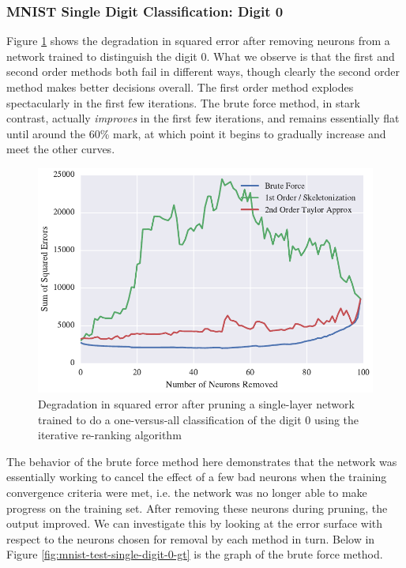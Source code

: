 \subsubsection{MNIST Single Digit Classification: Digit 0}

Figure \ref{fig:mnist-test-single-digit-0} shows the degradation in squared error after removing neurons from a network trained to distinguish the digit 0. What we observe is that the first and second order methods both fail in different ways, though clearly the second order method makes better decisions overall. The first order method explodes spectacularly in the first few iterations. The brute force method, in stark contrast, actually \textit{improves} in the first few iterations, and remains essentially flat until around the 60\% mark, at which point it begins to gradually increase and meet the other curves. 

\begin{figure}[!ht]
\centering
\includegraphics[width=0.5\linewidth]{mnist-test-single-digit-0.pdf}
\caption{Degradation in squared error after pruning a single-layer network trained to do a one-versus-all classification of the digit 0 using the iterative re-ranking algorithm}
\label{fig:mnist-test-single-digit-0}
\end{figure}

The behavior of the brute force method here demonstrates that the network was essentially working to cancel the effect of a few bad neurons when the training convergence criteria were met, i.e. the network was no longer able to make progress on the training set. After removing these neurons during pruning, the output improved. We can investigate this by looking at the error surface with respect to the neurons chosen for removal by each method in turn. Below in Figure \ref{fig:mnist-test-single-digit-0-gt} is the graph of the brute force method. 

